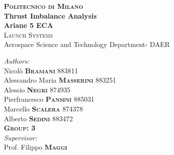 \documentclass[12pt,fleqn,openany]{book} %
\begin{document}
	
\begin{titlepage}
\begin{center}
\sffamily
\textsc{\Huge\bfseries Politecnico di Milano}\\[1.5cm] %
\LARGE{\bfseries Thrust Imbalance Analysis\\ Ariane 5 ECA}\\[0.5cm]  %
\textsc{\LARGE  Launch Systems}\\ %
\large {Aerospace Science and Technology Department- DAER}\\[1.5cm] %
\begin{flushright}
	\large
	\emph{Authors:}\\
	[0.5cm]
	Nicolò \textsc{\bfseries{Bramani}} 883811\\ %
	Alessandro Maria \textsc{\bfseries{Masserini}}  883251\\ %
	Alessio \textsc{\bfseries{Negri}}	874935\\ %
	Pierfrancesco \textsc{\bfseries{Pansini}} 885031\\ %
	Marcello \textsc{\bfseries{Scalera}} 874378\\ %
	Alberto \textsc{\bfseries{Sedini}} 883472\\ %
	\textsc{\bfseries{Group: 3}}\\
	[1cm]
	\emph{Supervisor:} \\
	[0.5cm]
	Prof. Filippo \textsc{\bfseries{Maggi}}\\ %
	[1cm]
\end{flushright}

\end{center}
\end{titlepage}
\end{document}
